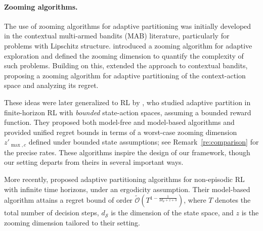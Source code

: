 \documentclass[final,supplement]{siamart251216}
\begin{document}
\paragraph{Zooming algorithms.}
The use of zooming algorithms for adaptive partitioning was initially developed in the contextual multi-armed bandits (MAB) literature, particularly for problems with Lipschitz structure. \cite{kleinberg2008multi} introduced a zooming algorithm for adaptive exploration and defined the {zooming dimension} to quantify the complexity of such problems. Building on this, \cite{slivkins2011contextual} extended the approach to contextual bandits, proposing a zooming algorithm for adaptive partitioning of the context-action space and analyzing its regret. 

These ideas were later generalized to RL by \cite{sinclair2023adaptive}, who studied adaptive partition in finite-horizon RL with {\it bounded} state-action spaces, assuming a bounded reward function. 
They proposed both model-free and model-based algorithms and provided unified regret bounds
in terms of a worst-case zooming dimension $z'_{\max,c}$ defined under bounded state
assumptions; see Remark~\ref{re:comparison} for the precise rates. These algorithms inspire
the design of our framework, though our setting departs from theirs in several important ways.



More recently, \cite{kar2024adaptive} proposed adaptive partitioning algorithms for non-episodic RL with infinite time horizons, under an ergodicity assumption. Their model-based algorithm attains a regret bound of order \(\tilde{\mathcal{O}}\left(T^{1 - \frac{1}{2d_{\mathcal{S}} + z + 3}}\right)\), where \(T\) denotes the total number of decision steps, \(d_{\mathcal{S}}\) is the dimension of the state space, and \(z\) is the zooming dimension tailored to their setting.
\end{document}
